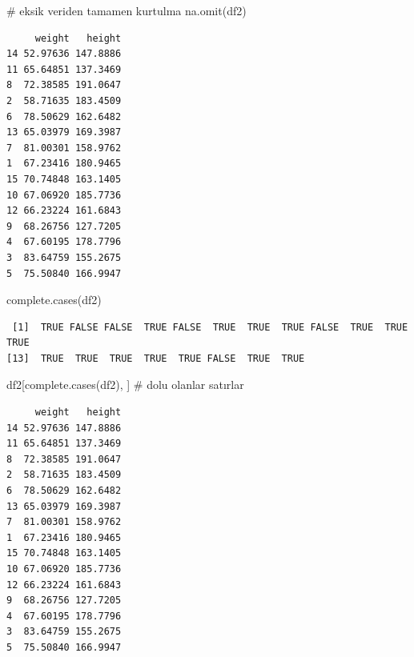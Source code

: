\documentclass[
  letterpaper,
  DIV=11,
  numbers=noendperiod]{scrreprt}
\newenvironment{Shaded}{\begin{snugshade}}{\end{snugshade}}
\newcommand{\CommentTok}[1]{\textcolor[rgb]{0.37,0.37,0.37}{#1}}
\newcommand{\FunctionTok}[1]{\textcolor[rgb]{0.28,0.35,0.67}{#1}}
\newcommand{\NormalTok}[1]{\textcolor[rgb]{0.00,0.23,0.31}{#1}}
\newcommand{\SpecialCharTok}[1]{\textcolor[rgb]{0.37,0.37,0.37}{#1}}
\begin{document}
\begin{Shaded}
\begin{Highlighting}[]
\CommentTok{\# eksik veriden tamamen kurtulma}
\FunctionTok{na.omit}\NormalTok{(df2)}
\end{Highlighting}
\end{Shaded}

\begin{verbatim}
     weight   height
14 52.97636 147.8886
11 65.64851 137.3469
8  72.38585 191.0647
2  58.71635 183.4509
6  78.50629 162.6482
13 65.03979 169.3987
7  81.00301 158.9762
1  67.23416 180.9465
15 70.74848 163.1405
10 67.06920 185.7736
12 66.23224 161.6843
9  68.26756 127.7205
4  67.60195 178.7796
3  83.64759 155.2675
5  75.50840 166.9947
\end{verbatim}

\begin{Shaded}
\begin{Highlighting}[]
\FunctionTok{complete.cases}\NormalTok{(df2)}
\end{Highlighting}
\end{Shaded}

\begin{verbatim}
 [1]  TRUE FALSE FALSE  TRUE FALSE  TRUE  TRUE  TRUE FALSE  TRUE  TRUE  TRUE
[13]  TRUE  TRUE  TRUE  TRUE  TRUE FALSE  TRUE  TRUE
\end{verbatim}

\begin{Shaded}
\begin{Highlighting}[]
\NormalTok{df2[}\FunctionTok{complete.cases}\NormalTok{(df2), ] }\CommentTok{\# dolu olanlar satırlar}
\end{Highlighting}
\end{Shaded}

\begin{verbatim}
     weight   height
14 52.97636 147.8886
11 65.64851 137.3469
8  72.38585 191.0647
2  58.71635 183.4509
6  78.50629 162.6482
13 65.03979 169.3987
7  81.00301 158.9762
1  67.23416 180.9465
15 70.74848 163.1405
10 67.06920 185.7736
12 66.23224 161.6843
9  68.26756 127.7205
4  67.60195 178.7796
3  83.64759 155.2675
5  75.50840 166.9947
\end{verbatim}

\begin{Shaded}
\end{Shaded}
\end{document}
